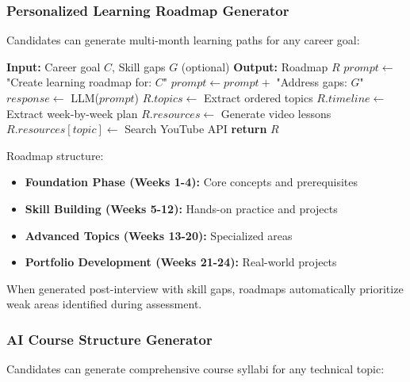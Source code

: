 \documentclass[conference]{IEEEtran}
\begin{document}
\subsubsection{Personalized Learning Roadmap Generator}

Candidates can generate multi-month learning paths for any career goal:

\begin{algorithm}[h]
\caption{Learning Roadmap Generation}
\label{alg:roadmap}
\begin{algorithmic}[1]
\STATE \textbf{Input:} Career goal $C$, Skill gaps $G$ (optional)
\STATE \textbf{Output:} Roadmap $R$
\STATE
\STATE $prompt \leftarrow$ "Create learning roadmap for: $C$"
    \STATE $prompt \leftarrow prompt +$ "Address gaps: $G$"
\ENDIF
\STATE $response \leftarrow$ LLM($prompt$)
\STATE $R.topics \leftarrow$ Extract ordered topics
\STATE $R.timeline \leftarrow$ Extract week-by-week plan
\STATE $R.resources \leftarrow$ Generate video lessons
    \STATE $R.resources[topic] \leftarrow$ Search YouTube API
\ENDFOR
\STATE \textbf{return} $R$
\end{algorithmic}
\end{algorithm}

Roadmap structure:
\begin{itemize}
    \item \textbf{Foundation Phase (Weeks 1-4):} Core concepts and prerequisites
    \item \textbf{Skill Building (Weeks 5-12):} Hands-on practice and projects
    \item \textbf{Advanced Topics (Weeks 13-20):} Specialized areas
    \item \textbf{Portfolio Development (Weeks 21-24):} Real-world projects
\end{itemize}

When generated post-interview with skill gaps, roadmaps automatically prioritize weak areas identified during assessment.

\subsubsection{AI Course Structure Generator}

Candidates can generate comprehensive course syllabi for any technical topic:
\end{document}
